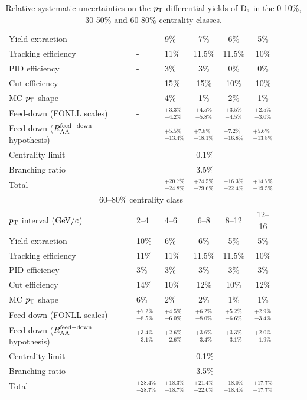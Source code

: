 \begin{table}[!h]
\begin{tabular}{|l|l|l|c|c|c|c|c|c|}
\hline
Yield extraction & -  & 9\% & 7\%& 6\%& 5\%\\
Tracking efficiency & -  & 11\% &11.5\% &11.5\% & 10\% \\
PID efficiency  & - & 3\%& 3\% & 0\%&  0\%\\
Cut efficiency  & - & 15\%& 15\%& 10\%& 10\%\\
MC $p_{\rm T}$ shape & -  & 4\%& 1\%& 2\%& 1\% \\
Feed-down (FONLL scales) & -  &$ ^{+3.3\%}_{-4.2\%}$ & $^{+4.5\%}_{-5.8\%} $&$ ^{+3.5\%}_{-4.5\%}$& $^{+2.5\%}_{-3.0\%}$\\
Feed-down ($R_{\rm AA}^{\rm feed-down}$ hypothesis)  & - & $^{+5.5\%}_{-13.4\%}$& $^{+7.8\%}_{-18.1\%} $&$ ^{+7.2\%}_{-16.8\%} $& $^{+5.6\%}_{-13.8\%}$ \\
\hline
Centrality limit & \multicolumn{5}{c|}{0.1\%}  \\
\hline
\hline
Branching ratio & \multicolumn{5}{c|}{3.5\%}  \\
\hline
\hline
Total  & - & $^{+20.7\%}_{-24.8\%}$& $^{+24.5\%}_{-29.6\%}$ & $^{+16.3\%}_{-22.4\%}$ & $^{+14.7\%}_{-19.5\%}$  \\
\hline
\hline
\multicolumn{6}{|c|}{60--80\% centrality class}       \\                                                                                                                                                                                                                                               \hline
$p_{\rm T}$ interval ($\mathrm{GeV}/c$)  &2--4      &    4--6          & 6--8      &   8--12            & 12--16                  \\ 
\hline
Yield extraction & 10\%  & 6\% & 6\%& 5\%& 5\%\\
Tracking efficiency & 11\%  & 11\% &11.5\% &11.5\% & 10\% \\
PID efficiency  & 3\% & 3\%& 3\% & 3\%&  3\%\\
Cut efficiency  & 14\% & 10\%& 12\%& 10\%& 12\%\\
MC $p_{\rm T}$ shape  & 6\% & 2\%& 2\%& 1\%& 1\% \\
Feed-down (FONLL scales) & $^{+7.2\%}_{-8.5\%} $& $^{+4.5\%}_{-6.0\%}$ & $^{+6.2\%}_{-8.0\%}$ & $^{+5.2\%}_{-6.6\%}$& $^{+2.9\%}_{-3.4\%}$\\
Feed-down ($R_{\rm AA}^{\rm feed-down}$ hypothesis)  & $^{+3.4\%}_{-3.1\%} $& $^{+2.6\%}_{-2.6\%}$& $^{+3.6\%}_{-3.4\%}$ &$ ^{+3.3\%}_{-3.1\%} $& $^{+2.0\%}_{-1.9\%}$ \\
\hline
Centrality limit & \multicolumn{5}{c|}{0.1\%}  \\
\hline
\hline
Branching ratio & \multicolumn{5}{c|}{3.5\%}  \\
\hline
\hline
Total  & $^{+28.4\%}_{-28.7\%}$& $^{+18.3\%}_{-18.7\%}$ & $^{+21.4\%}_{-22.0\%}$ & $^{+18.0\%}_{-18.4\%}$  & $^{+17.7\%}_{-17.7\%}$  \\
\hline
\end{tabular}
\caption{Relative systematic uncertainties on the $p_{\rm T}$-differential yields of ${\rm D_s}$ in the 0-10\%, 30-50\% and 60-80\% centrality classes.}
\label{tab:sysunc_yieldtable}
\end{table}

